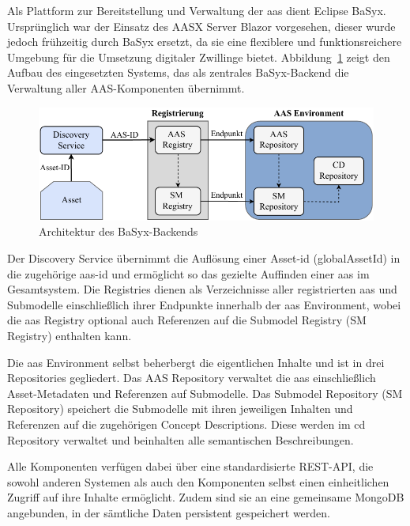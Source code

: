 Als Plattform zur Bereitstellung und Verwaltung der \acs{aas} dient Eclipse BaSyx.
Ursprünglich war der Einsatz des AASX Server Blazor vorgesehen, dieser wurde jedoch frühzeitig durch BaSyx ersetzt, da sie eine flexiblere und funktionsreichere Umgebung für die Umsetzung digitaler Zwillinge bietet.
Abbildung~\ref{fig:BaSyxArchitektur} zeigt den Aufbau des eingesetzten Systems, das als zentrales BaSyx-Backend die Verwaltung aller AAS-Komponenten übernimmt.

\begin{figure}[htbp]
    \centering
        \includegraphics[width=1\textwidth]{Bilder/Ergebnisse/Systemarchitektur/BaSyx.pdf}
    \caption{Architektur des BaSyx-Backends}
    \label{fig:BaSyxArchitektur}
\end{figure}
\vspace{-0.5em}

Der Discovery Service übernimmt die Auflösung einer Asset-\acs{id} (globalAssetId) in die zugehörige \acs{aas}-\acs{id} und ermöglicht so das gezielte Auffinden einer \acs{aas} im Gesamtsystem. 
Die Registries dienen als Verzeichnisse aller registrierten \acs{aas} und Submodelle einschließlich ihrer Endpunkte innerhalb der \acs{aas} Environment, wobei die \acs{aas} Registry optional auch Referenzen auf die Submodel Registry (SM Registry) enthalten kann. 

Die \acs{aas} Environment selbst beherbergt die eigentlichen Inhalte und ist in drei Repositories gegliedert. 
Das AAS Repository verwaltet die \acs{aas} einschließlich Asset-Metadaten und Referenzen auf Submodelle. 
Das Submodel Repository (SM Repository) speichert die Submodelle mit ihren jeweiligen Inhalten und Referenzen auf die zugehörigen Concept Descriptions. 
Diese werden im \acs{cd} Repository verwaltet und beinhalten alle semantischen Beschreibungen.

Alle Komponenten verfügen dabei über eine standardisierte REST-API, die sowohl anderen Systemen als auch den Komponenten selbst einen einheitlichen Zugriff auf ihre Inhalte ermöglicht. 
Zudem sind sie an eine gemeinsame MongoDB angebunden, in der sämtliche Daten persistent gespeichert werden.

